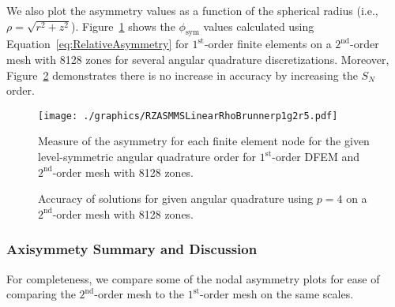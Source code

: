 \documentclass[12pt]{article}
\begin{document}
We also plot the asymmetry values as a function of the spherical radius (i.e., $\rho=\sqrt{r^2+z^2}$). Figure~\ref{fig:RZASMMSLinearRhoBrunnerp1g2r5Nodes} shows the $\phi_\text{sym}$ values calculated using Equation~\ref{eq:RelativeAsymmetry} for $1^\text{st}$-order finite elements on a $2^\text{nd}$-order mesh with 8128 zones for several angular quadrature discretizations. Moreover, Figure~\ref{fig:RZASMMSLinearRhoBrunnerp4g2r5Accuracy} demonstrates there is no increase in accuracy by increasing the $S_N$ order.

\begin{figure}[!htb]
\centering
\texttt{[image: ./graphics/RZASMMSLinearRhoBrunnerp1g2r5.pdf]}
\caption{Measure of the asymmetry for each finite element node for the given level-symmetric angular quadrature order for $1^\text{st}$-order DFEM and $2^\text{nd}$-order mesh with 8128 zones.}
\label{fig:RZASMMSLinearRhoBrunnerp1g2r5Nodes}
\end{figure}

\begin{figure}[!htb]
\centering
{}
\caption{Accuracy of solutions for given angular quadrature using $p=4$ on a $2^\text{nd}$-order mesh with 8128 zones.}
\label{fig:RZASMMSLinearRhoBrunnerp4g2r5Accuracy}
\end{figure}

\FloatBarrier

\subsubsection{Axisymmety Summary and Discussion}
\label{sub:AxiSymSummaryDiscussion}
For completeness, we compare some of the nodal asymmetry plots for ease of comparing the $2^\text{nd}$-order mesh to the $1^\text{st}$-order mesh on the same scales.
\end{document}
